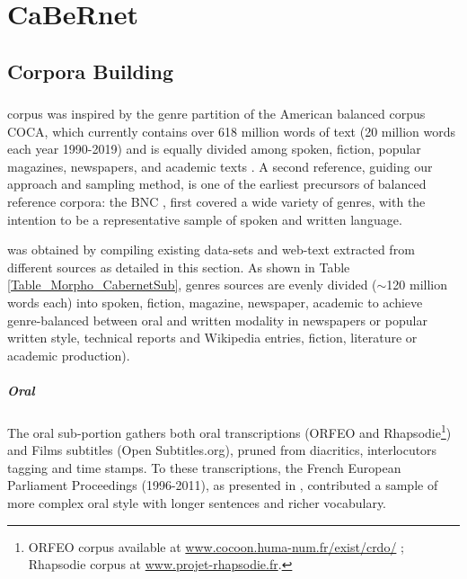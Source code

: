 \chapter{CaBeRnet}


\section{Corpora Building}%
\label{sec:DescribeCorpora}

\subsection{\Cabernet} \label{subsec:DescribeCaBeRnet}

\Cabernet corpus was inspired by the genre partition of the American balanced corpus COCA, %
which currently contains over 618 million words of text (20 million words each year 1990-2019) and is equally divided among spoken, fiction, popular magazines, newspapers, and academic texts \citep{davies-2009-the, davies-2010-the}. A second reference, guiding our approach and sampling method, is one of the earliest precursors of balanced reference corpora: the BNC \citep{bnc-2007-the}, first covered a wide variety of genres, with the intention to be a representative sample of spoken and written language.

\Cabernet was obtained by compiling existing data-sets and web-text extracted from different sources as detailed in this section. As shown in Table \ref{Table_Morpho_CabernetSub}, genres sources are evenly divided ($\sim$120 million words each) into spoken, fiction, magazine, newspaper, academic to achieve genre-balanced between oral and written modality in newspapers or popular written style, technical reports and Wikipedia entries, fiction, literature or academic production).

\paragraph{\Cabernet Oral} \label{subsec:DescribeCaBeRnetOral}
The oral sub-portion gathers both oral transcriptions (\textsc{ORFEO} and Rhapsodie\footnote{\textsc{ORFEO} corpus available at \url{www.cocoon.huma-num.fr/exist/crdo/} ; Rhapsodie corpus at \url{www.projet-rhapsodie.fr}.}) and Films subtitles (Open Subtitles.org), pruned from diacritics, interlocutors tagging and time stamps. To these transcriptions, the French European Parliament Proceedings (1996-2011), as presented in \citet{koehn-2005-europarl}, contributed a sample of more complex oral style with longer sentences and richer vocabulary.%

